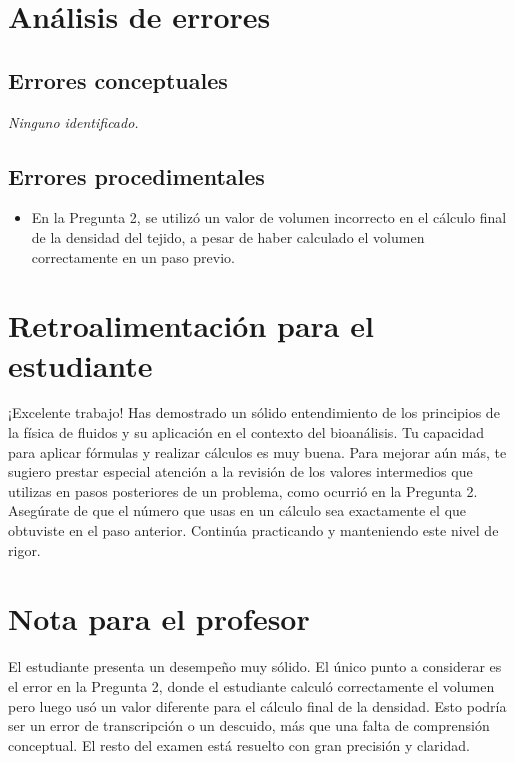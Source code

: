 \documentclass[11pt,a4paper]{article}
\begin{document}
\section*{Análisis de errores}

\subsection*{Errores conceptuales}
\textit{Ninguno identificado.}

\subsection*{Errores procedimentales}
\begin{itemize}[leftmargin=1.5em, itemsep=2pt]
  \item En la Pregunta 2, se utilizó un valor de volumen incorrecto en el cálculo final de la densidad del tejido, a pesar de haber calculado el volumen correctamente en un paso previo.
\end{itemize}

\section*{Retroalimentación para el estudiante}
\begin{tcolorbox}[cajaRecomendacion, title={Dirigido a: maria frontado 32747212}]
¡Excelente trabajo! Has demostrado un sólido entendimiento de los principios de la física de fluidos y su aplicación en el contexto del bioanálisis. Tu capacidad para aplicar fórmulas y realizar cálculos es muy buena. Para mejorar aún más, te sugiero prestar especial atención a la revisión de los valores intermedios que utilizas en pasos posteriores de un problema, como ocurrió en la Pregunta 2. Asegúrate de que el número que usas en un cálculo sea exactamente el que obtuviste en el paso anterior. Continúa practicando y manteniendo este nivel de rigor.
\end{tcolorbox}

\section*{Nota para el profesor}
\begin{tcolorbox}[
  enhanced, breakable,
  colback=yellow!8, colframe=yellow!60!black,
  fonttitle=\bfseries, coltitle=black,
  title={Observaciones para revisión manual},
  top=4pt, bottom=4pt, left=8pt, right=8pt,
]
El estudiante presenta un desempeño muy sólido. El único punto a considerar es el error en la Pregunta 2, donde el estudiante calculó correctamente el volumen pero luego usó un valor diferente para el cálculo final de la densidad. Esto podría ser un error de transcripción o un descuido, más que una falta de comprensión conceptual. El resto del examen está resuelto con gran precisión y claridad.
\end{tcolorbox}
\end{document}
